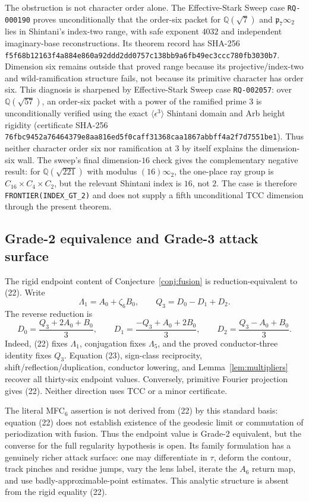 \documentclass[11pt]{article}
\begin{document}
The obstruction is not character order alone.  The Effective-Stark
Sweep case \texttt{RQ-000190} proves unconditionally that the
order-six packet for $\mathbb Q(\sqrt7)$ and
$\mathfrak p_7\infty_2$ lies in Shintani's index-two range, with safe
exponent $4032$ and independent imaginary-base reconstructions.
Its theorem record has SHA-256
\texttt{f5f68b12163f4a884e860a92ddd2dd0757c138bb9a6fb49ec3ccc780fb3030b7}.
Dimension six remains outside that proved range because its
projective/index-two and wild-ramification structure fails, not
because its primitive character has order six.
This diagnosis is sharpened by Effective-Stark Sweep case
\texttt{RQ-002057}: over $\mathbb Q(\sqrt{57})$, an order-six packet
with a power of the ramified prime $3$ is unconditionally verified
using the exact $\langle\epsilon^3\rangle$ Shintani domain and Arb
height rigidity (certificate SHA-256
\texttt{76fbc9452a76464379e8aa816ed5f0caff31368caa1867abbff4a2f7d7551be1}).
Thus neither character order six nor ramification at $3$ by itself
explains the dimension-six wall.
The sweep's final dimension-$16$ check gives the complementary
negative result: for $\mathbb Q(\sqrt{221})$ with modulus
$(16)\infty_2$, the one-place ray group is
$C_{16}\times C_4\times C_2$, but the relevant Shintani index is
$16$, not $2$.  The case is therefore
\texttt{FRONTIER(INDEX\_GT\_2)} and does not supply a fifth
unconditional TCC dimension through the present theorem.

\subsection*{Grade-2 equivalence and Grade-3 attack surface}

The rigid endpoint content of Conjecture~\ref{conj:fusion} is
reduction-equivalent to (22).  Write
\[
 \Lambda_1=A_0+\zeta_6B_0,\qquad Q_3=D_0-D_1+D_2.
\]
The reverse reduction is
\[
 D_0=\frac{Q_3+2A_0+B_0}{3},\qquad
 D_1=\frac{-Q_3+A_0+2B_0}{3},\qquad
 D_2=\frac{Q_3-A_0+B_0}{3}.
\tag{23}
\]
Indeed, (22) fixes $\Lambda_1$, conjugation fixes $\Lambda_5$, and the
proved conductor-three identity fixes $Q_3$.  Equation (23), sign-class
reciprocity, shift/reflection/duplication, conductor lowering, and
Lemma~\ref{lem:multipliers} recover all thirty-six endpoint values.
Conversely, primitive Fourier projection gives (22).  Neither direction
uses TCC or a minor certificate.

The literal MFC$_6$ assertion is not derived from (22) by this standard
basis: equation (22) does not establish existence of the geodesic limit
or commutation of periodization with fusion.  Thus the endpoint value is
Grade-2 equivalent, but the converse for the full regularity hypothesis
is open.  Its family formulation has a genuinely
richer attack surface: one may differentiate in $\tau$, deform the
contour, track pinches and residue jumps, vary the lens label, iterate
the $A_6$ return map, and use badly-approximable-point estimates.  This
analytic structure is absent from the rigid equality (22).
\end{document}
